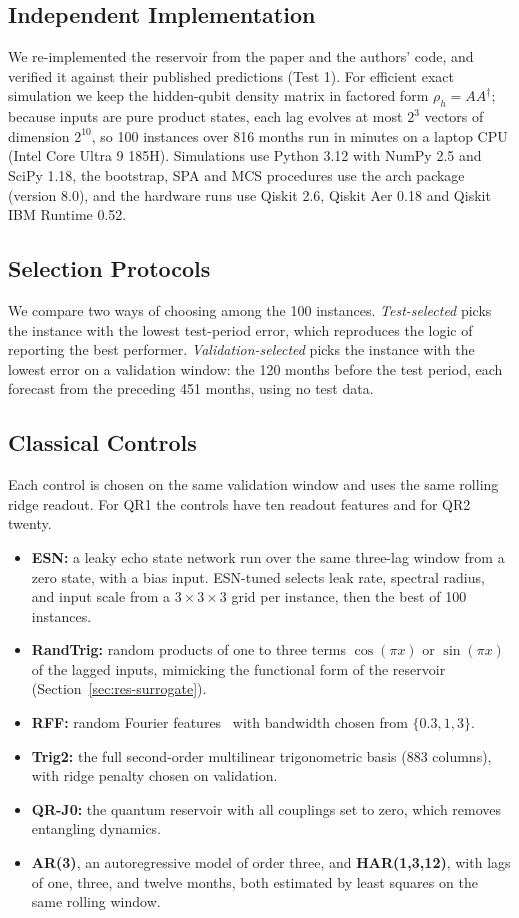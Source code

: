 \documentclass{ieeeaccess}
\begin{document}
\subsection{Independent Implementation}
We re-implemented the reservoir from the paper and the authors' code, and verified it against their published predictions (Test 1). For efficient exact simulation we keep the hidden-qubit density matrix in factored form $\rho_h=AA^\dagger$; because inputs are pure product states, each lag evolves at most $2^{3}$ vectors of dimension $2^{10}$, so 100 instances over 816 months run in minutes on a laptop CPU (Intel Core Ultra 9 185H). Simulations use Python 3.12 with NumPy 2.5 and SciPy 1.18, the bootstrap, SPA and MCS procedures use the arch package (version 8.0), and the hardware runs use Qiskit 2.6, Qiskit Aer 0.18 and Qiskit IBM Runtime 0.52.

\subsection{Selection Protocols}
We compare two ways of choosing among the 100 instances. \emph{Test-selected} picks the instance with the lowest test-period error, which reproduces the logic of reporting the best performer. \emph{Validation-selected} picks the instance with the lowest error on a validation window: the 120 months before the test period, each forecast from the preceding 451 months, using no test data.

\subsection{Classical Controls}
Each control is chosen on the same validation window and uses the same rolling ridge readout. For QR1 the controls have ten readout features and for QR2 twenty.
\begin{itemize}
\item \textbf{ESN:} a leaky echo state network run over the same three-lag window from a zero state, with a bias input. ESN-tuned selects leak rate, spectral radius, and input scale from a $3\times3\times3$ grid per instance, then the best of 100 instances.
\item \textbf{RandTrig:} random products of one to three terms $\cos(\pi x)$ or $\sin(\pi x)$ of the lagged inputs, mimicking the functional form of the reservoir (Section~\ref{sec:res-surrogate}).
\item \textbf{RFF:} random Fourier features~\cite{rahimi2007} with bandwidth chosen from $\{0.3,1,3\}$.
\item \textbf{Trig2:} the full second-order multilinear trigonometric basis (883 columns), with ridge penalty chosen on validation.
\item \textbf{QR-J0:} the quantum reservoir with all couplings set to zero, which removes entangling dynamics.
\item \textbf{AR(3)}, an autoregressive model of order three, and \textbf{HAR(1,3,12)}, with lags of one, three, and twelve months, both estimated by least squares on the same rolling window.
\end{itemize}
\end{document}
